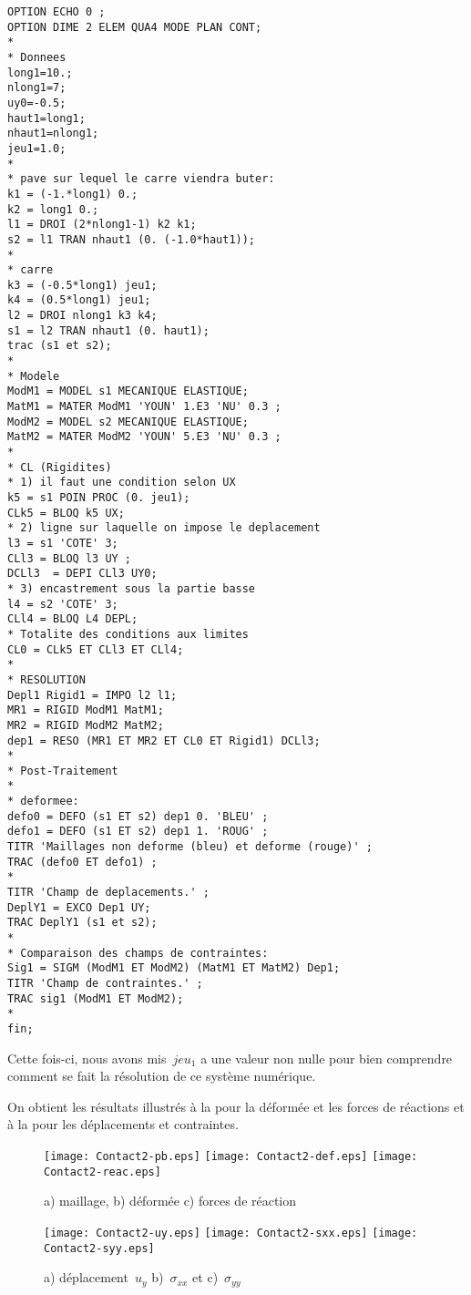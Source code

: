 \begin{multicols}{2}
\begin{lstlisting}[firstnumber=1]
OPTION ECHO 0 ;
OPTION DIME 2 ELEM QUA4 MODE PLAN CONT;
*
* Donnees
long1=10.;
nlong1=7;
uy0=-0.5;
haut1=long1;
nhaut1=nlong1;
jeu1=1.0;
*
* pave sur lequel le carre viendra buter:
k1 = (-1.*long1) 0.;
k2 = long1 0.;
l1 = DROI (2*nlong1-1) k2 k1;
s2 = l1 TRAN nhaut1 (0. (-1.0*haut1));
*
* carre
k3 = (-0.5*long1) jeu1;
k4 = (0.5*long1) jeu1;
l2 = DROI nlong1 k3 k4;
s1 = l2 TRAN nhaut1 (0. haut1);
trac (s1 et s2);
*
* Modele
ModM1 = MODEL s1 MECANIQUE ELASTIQUE;
MatM1 = MATER ModM1 'YOUN' 1.E3 'NU' 0.3 ;
ModM2 = MODEL s2 MECANIQUE ELASTIQUE;
MatM2 = MATER ModM2 'YOUN' 5.E3 'NU' 0.3 ;
*
* CL (Rigidites)
* 1) il faut une condition selon UX
k5 = s1 POIN PROC (0. jeu1);
CLk5 = BLOQ k5 UX;
* 2) ligne sur laquelle on impose le deplacement
l3 = s1 'COTE' 3;
CLl3 = BLOQ l3 UY ;
DCLl3  = DEPI CLl3 UY0;
* 3) encastrement sous la partie basse
l4 = s2 'COTE' 3;
CLl4 = BLOQ L4 DEPL;
* Totalite des conditions aux limites
CL0 = CLk5 ET CLl3 ET CLl4;
*
* RESOLUTION
Depl1 Rigid1 = IMPO l2 l1;
MR1 = RIGID ModM1 MatM1;
MR2 = RIGID ModM2 MatM2;
dep1 = RESO (MR1 ET MR2 ET CL0 ET Rigid1) DCLl3;
*
* Post-Traitement
*
* deformee:
defo0 = DEFO (s1 ET s2) dep1 0. 'BLEU' ;
defo1 = DEFO (s1 ET s2) dep1 1. 'ROUG' ;
TITR 'Maillages non deforme (bleu) et deforme (rouge)' ;
TRAC (defo0 ET defo1) ;
*
TITR 'Champ de deplacements.' ;
DeplY1 = EXCO Dep1 UY;
TRAC DeplY1 (s1 et s2);
*
* Comparaison des champs de contraintes:
Sig1 = SIGM (ModM1 ET ModM2) (MatM1 ET MatM2) Dep1;
TITR 'Champ de contraintes.' ;
TRAC sig1 (ModM1 ET ModM2);
*
fin;
\end{lstlisting}
\end{multicols}

Cette fois-ci, nous avons mis~$jeu_1$ a une valeur non nulle pour bien comprendre comment se fait la résolution de ce système numérique.

On obtient les résultats illustrés à la  pour la déformée et les forces de réactions et à la  pour les déplacements et contraintes.
\begin{figure}[ht]
  \texttt{[image: Contact2-pb.eps]} \hfill 
  \texttt{[image: Contact2-def.eps]}\hfill 
  \texttt{[image: Contact2-reac.eps]}
  \caption{\label{Fig-Cont21} a) maillage, b) déformée c) forces de réaction}
\end{figure}

\begin{figure}[ht]
  \texttt{[image: Contact2-uy.eps]} \hfill 
  \texttt{[image: Contact2-sxx.eps]}\hfill 
  \texttt{[image: Contact2-syy.eps]}
  \caption{\label{Fig-Cont22} a) déplacement~$u_y$ b)~$\sigma_{xx}$ et c)~$\sigma_{yy}$}
\end{figure}








